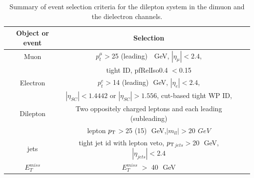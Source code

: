 \documentclass{cernatlasnote}
\newcommand{\pt}{$p_{\text T}$\xspace}
\newcommand{\cPqb}{b\xspace}
\newcommand{\GeV}{\,GeV\xspace}
\begin{document}
\begin{table}[htp]%
\begin{center}
 \begin{tabular}{|c|c|c|c|} \hline

        Object or event    &   Selection \\ \hline
             Muon & $p^{\mu}_{t}>$25 (leading) ~\GeV, $|\eta_\mu|<2.4$,\\
              &  tight ID, pfRelIso0.4 $<$0.15 \\ \hline
     Electron & $p^{e}_{t}>$14 (leading)~\GeV, $|\eta_e|<2.4$,\\
              &  $|\eta_{SC}| < 1.4442$ or $|\eta_{SC}| > 1.556 $, cut-based tight WP ID, \\ \hline
    Dilepton    &  Two oppositely charged leptons and each leading (subleading) \\
               &               lepton \pt$>$25 (15)~\GeV,$|m_{ll}|>20~\GeV$ \\ \hline
    jets & {tight jet id with lepton veto, \pt$_{jets}>$20~\GeV, $|\eta_{jets}|<2.4$} \\ \hline
    $E_T^{miss}$ &   $E_{T}^{miss}$ $>$ 40~\GeV  \\ \hline
 \end{tabular}
\end{center}
\caption{Summary of event selection criteria for the dilepton system in the dimuon and the dielectron channels.}
\label{tab:selection}
\end{table}
\end{document}
